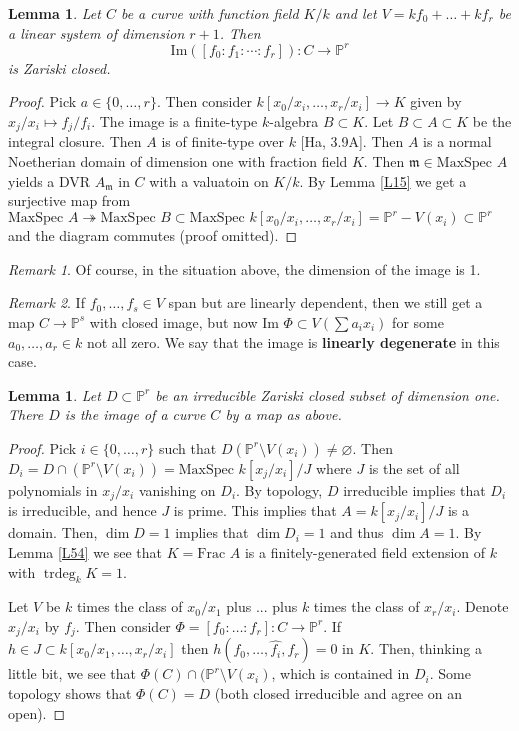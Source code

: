 \documentclass{article}
\newcommand{\Proj}{\mathbb{P}}
\newcommand{\fr}{\mathfrak}
\DeclareMathOperator{\trdeg}{trdeg}
\theoremstyle{plain}
\newtheorem{lem}[thm]{Lemma}
\theoremstyle{definition}
\theoremstyle{remark}
\newtheorem*{rem}{Remark}
\begin{document}
\begin{lem}
\label{L104}
Let $C$ be a curve with function field $K/k$ and let $V=kf_0+\ldots+kf_r$ be a linear system of dimension $r+1$. Then
\[\text{Im}\left([f_0:f_1:\cdots :f_r]\right):C\to\Proj^r\]
is Zariski closed.
\end{lem}
\begin{proof}
Pick $a\in\{0,\ldots, r\}$. Then consider
$k[x_0/x_i,\ldots, x_r/x_i]\to K$ given by $x_j/x_i\mapsto f_j/f_i$. The image is a finite-type $k$-algebra $B\subset K$. Let $B\subset A\subset K$ be the integral closure. Then $A$ is of finite-type over $k$ [Ha, 3.9A]. Then $A$ is a normal Noetherian domain of dimension one with fraction field $K$. Then $\fr m\in\text{MaxSpec } A$ yields a DVR $A_\fr m$ in $C$ with a valuatoin on $K/k$. By Lemma \ref{L15} we get a surjective map from $\text{MaxSpec } A\twoheadrightarrow \text{MaxSpec } B\subset\text{MaxSpec }k[x_0/x_i,\ldots,x_r/x_i]=\Proj^r-V(x_i)\subset\Proj^r$ and the diagram commutes (proof omitted).
\end{proof}

\begin{rem}
Of course, in the situation above, the dimension of the image is 1.
\end{rem}
\begin{rem}
If $f_0,\ldots, f_s\in V$ span but are linearly dependent, then we still get a map $C\to\Proj^s$ with closed image, but now $\text{Im }\Phi\subset V(\sum a_ix_i)$ for some $a_0,\ldots,a_r\in k$ not all zero. We say that the image is \textbf{linearly degenerate} in this case. 
\end{rem}

\begin{lem}
\label{L105}
Let $D\subset\Proj^r$ be an irreducible Zariski closed subset of dimension one. There $D$ is the image of a curve $C$ by a map as above.
\end{lem}
\begin{proof}
Pick $i\in\{0,\ldots,r\}$ such that $D(\Proj^r\setminus V(x_i))\neq\varnothing$. Then $D_i=D\cap(\Proj^r\setminus V(x_i))=\text{MaxSpec } k[x_j/x_i]/J$ where $J$ is the set of all polynomials in $x_j/x_i$ vanishing on $D_i$. By topology, $D$ irreducible implies that $D_i$ is irreducible, and hence $J$ is prime. This implies that $A=k[x_j/x_i]/J$ is a domain. Then, $\dim D=1$ implies that $\dim D_i=1$ and thus $\dim A=1$. By Lemma \ref{L54} we see that $K=\text{Frac } A$ is a finitely-generated field extension of $k$ with $\trdeg_k K=1$.

Let $V$ be $k$ times the class of $x_0/x_1$ plus ... plus $k$ times the class of $x_r/x_i$. Denote $x_j/x_i$ by $f_j$. Then consider $\Phi=[f_0:\ldots:f_r]:C\to\Proj^r$. If $h\in J\subset k[x_0/x_1,\ldots,x_r/x_i]$ then $h(f_0,\ldots,\hat{f_i},f_r)=0$ in $K$. Then, thinking a little bit, we see that $\Phi(C)\cap(\Proj^r\setminus V(x_i)$, which is contained in $D_i$. Some topology shows that $\Phi(C)=D$ (both closed irreducible and agree on an open).
\end{proof}
\end{document}
